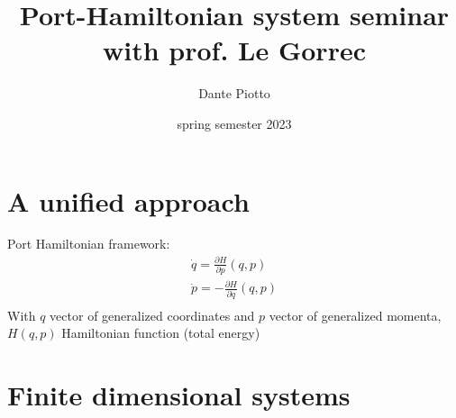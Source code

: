 \documentclass{article}
\title{Port-Hamiltonian system seminar with prof. Le Gorrec}
\author{Dante Piotto}
\date{spring semester 2023}
\theoremstyle{definition}
\theoremstyle{remark}
\theoremstyle{remark}
\begin{document}
\section{A unified approach}
Port Hamiltonian framework: 
\begin{gather}
    \dot{q} = \displaystyle\frac{\partial H }{\partial p}(q,p)\\
    \dot{p} = -\displaystyle\frac{\partial H }{\partial q}(q,p)\\
\end{gather}
With $q$ vector of generalized coordinates and $p$ vector of generalized momenta, $H(q,p)$ Hamiltonian function (total energy)





















\section{Finite dimensional systems}
\end{document}
